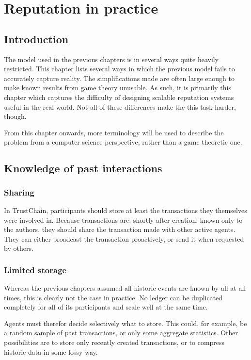 \chapter{Reputation in practice}
\section{Introduction}
The model used in the previous chapters is in several ways quite heavily restricted. This chapter lists several ways in which the previous model fails to accurately capture reality. The simplifications made are often large enough to make known results from game theory unusable. As such, it is primarily this chapter which captures the difficulty of designing scalable reputation systems useful in the real world. Not all of these differences make the this task harder, though.

From this chapter onwards, more terminology will be used to describe the problem from a computer science perspective, rather than a game theoretic one.

\section{Knowledge of past interactions}
\subsection{Sharing}
In TrustChain, participants should store at least the transactions they themselves were involved in. Because transactions are, shortly after creation, known only to the authors, they should share the transaction made with other active agents. They can either broadcast the transaction proactively, or send it when requested by others.

\subsection{Limited storage}
Whereas the previous chapters assumed all historic events are known by all at all times, this is clearly not the case in practice. No ledger can be duplicated completely for all of its participants and scale well at the same time.

Agents must therefor decide selectively what to store. This could, for example, be a random sample of past transactions, or only some aggregate statistics. Other possibilities are to store only recently created transactions, or to compress historic data in some lossy way.

